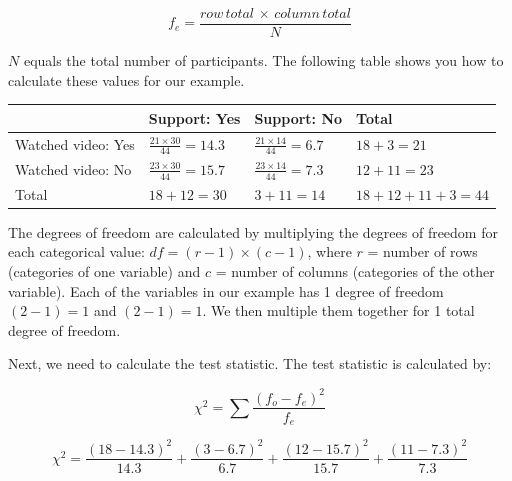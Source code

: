 \documentclass[
  letterpaper,
  DIV=11,
  numbers=noendperiod]{scrreprt}
\begin{document}
\[
f_e = \frac{row \, total\, \times \,column \, total}{N}
\]

\(N\) equals the total number of participants. The following table shows
you how to calculate these values for our example.

\begin{longtable}[]{@{}
  >{\raggedright\arraybackslash}p{}
  >{\raggedright\arraybackslash}p{}
  >{\raggedright\arraybackslash}p{}
  >{\raggedright\arraybackslash}p{}@{}}
\toprule\noalign{}
\begin{minipage}[b]{\linewidth}\raggedright
\end{minipage} & \begin{minipage}[b]{\linewidth}\raggedright
Support: Yes
\end{minipage} & \begin{minipage}[b]{\linewidth}\raggedright
Support: No
\end{minipage} & \begin{minipage}[b]{\linewidth}\raggedright
Total
\end{minipage} \\
\midrule\noalign{}
\endhead
\bottomrule\noalign{}
\endlastfoot
Watched video: Yes & \(\frac{21 \times 30}{44} = 14.3\) &
\(\frac{21 \times 14}{44} = 6.7\) & \(18 + 3 = 21\) \\
Watched video: No & \(\frac{23 \times 30}{44} = 15.7\) &
\(\frac{23 \times 14}{44} = 7.3\) & \(12 + 11 = 23\) \\
Total & \(18 + 12 = 30\) & \(3 + 11 = 14\) &
\(18 + 12 + 11 + 3 = 44\) \\
\end{longtable}

The degrees of freedom are calculated by multiplying the degrees of
freedom for each categorical value: \(df = (r−1)\times(c−1)\), where
\(r\) = number of rows (categories of one variable) and \(c\) = number
of columns (categories of the other variable). Each of the variables in
our example has 1 degree of freedom \((2 - 1) = 1\) and \((2 - 1) = 1\).
We then multiple them together for 1 total degree of freedom.

Next, we need to calculate the test statistic. The test statistic is
calculated by:

\[
\chi^2 = \sum \frac{(f_o - f_e)^2}{f_e}
\]

\[
\chi^2 =
\frac{(18 - 14.3)^2}{14.3}
+ \frac{(3 - 6.7)^2}{6.7}
+ \frac{(12 - 15.7)^2}{15.7}
+ \frac{(11 - 7.3)^2}{7.3}
\]
\end{document}

